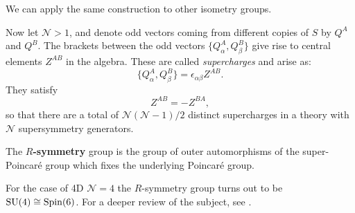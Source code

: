 	We can apply the same construction to other isometry groups.
	
	Now let $\mathcal N > 1$, and denote odd vectors coming from different copies of $S$ by $Q^A$ and $Q^B$. The brackets between the odd vectors $\{Q^A_\alpha, Q^B_\beta \} $ give rise to  central elements $Z^{AB}$ in the algebra. These are called \emph{supercharges} and arise as:
	$$\{Q^A_\alpha, Q^B_\beta \} = \epsilon_{\alpha \beta} Z^{AB}.$$
	They satisfy
	$$Z^{AB} = -Z^{BA},$$
	so that there are a total of $\mathcal N (\mathcal N - 1)/2$ distinct supercharges in a theory with $\mathcal N$ supersymmetry generators. 
	
	\begin{defn}
		The \textbf{$R$-symmetry} group is the group of outer automorphisms of the super-Poincar\'e group which fixes the underlying Poincar\'e group. 
	\end{defn}
	For the case of 4D $\mathcal N = 4$ the $R$-symmetry group turns out to be $\mathrm{SU}(4) \cong \mathrm{Spin}(6)$. For a deeper review of the subject, see \cite{quevedo2010}.
	

	